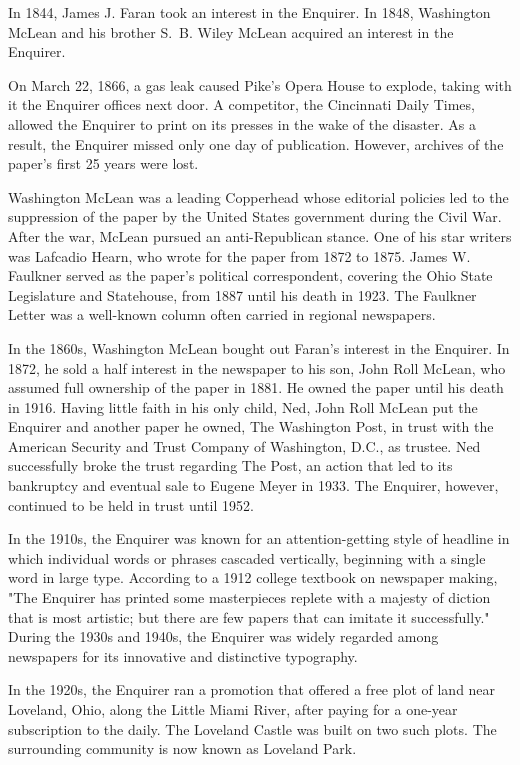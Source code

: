 In 1844, James J. Faran took an interest in the Enquirer. In 1848,
Washington McLean and his brother S.~B. Wiley McLean acquired an
interest in the Enquirer.

On March 22, 1866, a gas leak caused Pike's Opera House to explode,
taking with it the Enquirer offices next door. A competitor, the
Cincinnati Daily Times, allowed the Enquirer to print on its presses in
the wake of the disaster. As a result, the Enquirer missed only one day
of publication. However, archives of the paper's first 25 years were
lost.

Washington McLean was a leading Copperhead whose editorial policies led
to the suppression of the paper by the United States government during
the Civil War. After the war, McLean pursued an anti-Republican stance.
One of his star writers was Lafcadio Hearn, who wrote for the paper from
1872 to 1875. James W. Faulkner served as the paper's political
correspondent, covering the Ohio State Legislature and Statehouse, from
1887 until his death in 1923. The Faulkner Letter was a well-known
column often carried in regional newspapers.

In the 1860s, Washington McLean bought out Faran's interest in the
Enquirer. In 1872, he sold a half interest in the newspaper to his son,
John Roll McLean, who assumed full ownership of the paper in 1881. He
owned the paper until his death in 1916. Having little faith in his only
child, Ned, John Roll McLean put the Enquirer and another paper he
owned, The Washington Post, in trust with the American Security and
Trust Company of Washington, D.C., as trustee. Ned successfully broke
the trust regarding The Post, an action that led to its bankruptcy and
eventual sale to Eugene Meyer in 1933. The Enquirer, however, continued
to be held in trust until 1952.

In the 1910s, the Enquirer was known for an attention-getting style of
headline in which individual words or phrases cascaded vertically,
beginning with a single word in large type. According to a 1912 college
textbook on newspaper making, "The Enquirer has printed some
masterpieces replete with a majesty of diction that is most artistic;
but there are few papers that can imitate it successfully." During the
1930s and 1940s, the Enquirer was widely regarded among newspapers for
its innovative and distinctive typography.

In the 1920s, the Enquirer ran a promotion that offered a free plot of
land near Loveland, Ohio, along the Little Miami River, after paying for
a one-year subscription to the daily. The Loveland Castle was built on
two such plots. The surrounding community is now known as Loveland Park.

